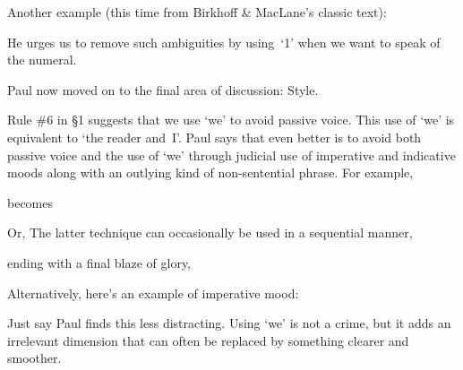 Another example (this time from Birkhoff \& MacLane's classic text):
\par\nobreak\smallskip
{}
  He urges us to remove such ambiguities by 
using~`1' when we want to speak of the numeral.
\par\nobreak\smallskip
{}

Paul now moved on to the final area of discussion: Style. 

Rule \#6 in \S1 suggests that we use `we' to avoid passive voice.
This use of `we' is equivalent to `the reader and~I'.  Paul says that even
better is to avoid both passive voice and the use of `we' through judicial
use of imperative and indicative moods along with an outlying kind of
non-sentential phrase.
For example,
\par\nobreak\smallskip
{}
becomes
\par\nobreak\smallskip
{}
Or,
The latter technique can occasionally be used in a sequential manner,
\par\nobreak\smallskip
{}
ending with a final blaze of glory,
\par\nobreak\smallskip
{}

Alternatively, here's an example of imperative mood:
\par\nobreak\smallskip
{}
Just say
Paul finds this less distracting.  Using `we' is not a crime, but it adds
an irrelevant dimension that can often
 be replaced by something clearer and smoother.

